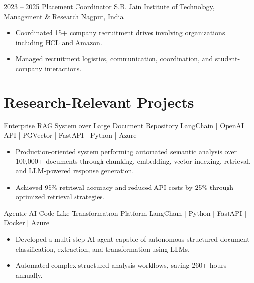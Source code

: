 \documentclass[11pt,a4paper,sans]{moderncv}
\begin{document}
\cventry
{2023 -- 2025}
{Placement Coordinator}
{S.B. Jain Institute of Technology, Management \& Research}
{Nagpur, India}
{}
{
\begin{itemize}

\item
Coordinated 15+ company recruitment drives involving organizations
including HCL and Amazon.

\item
Managed recruitment logistics, communication, coordination, and
student-company interactions.

\end{itemize}
}


\section{Research-Relevant Projects}

\cventry
{}
{Enterprise RAG System over Large Document Repository}
{LangChain | OpenAI API | PGVector | FastAPI | Python | Azure}
{}
{}
{
\begin{itemize}

\item
Production-oriented system performing automated semantic analysis
over 100,000+ documents through chunking, embedding, vector indexing,
retrieval, and LLM-powered response generation.

\item
Achieved 95\% retrieval accuracy and reduced API costs by 25\%
through optimized retrieval strategies.

\end{itemize}
}

\cventry
{}
{Agentic AI Code-Like Transformation Platform}
{LangChain | Python | FastAPI | Docker | Azure}
{}
{}
{
\begin{itemize}

\item
Developed a multi-step AI agent capable of autonomous structured
document classification, extraction, and transformation using LLMs.

\item
Automated complex structured analysis workflows, saving 260+ hours
annually.

\end{itemize}
}
\end{document}
